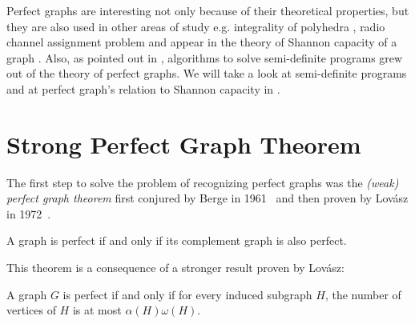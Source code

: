 Perfect graphs are interesting not only because of their theoretical properties, but they are also used in other areas of study e.g. integrality of polyhedra \cite{Chvtal1975, Chudnovsky2003}, radio channel assignment problem \cite{McDiarmid99, McDiarmid2000} and appear in the theory of Shannon capacity of a graph \cite{Lovasz1979}. Also, as pointed out in \cite{alfonsinPerfect2001, Chudnovsky2003}, algorithms to solve semi-definite programs grew out of the theory of perfect graphs. We will take a look at semi-definite programs and at perfect graph's relation to Shannon capacity in .

\section{Strong Perfect Graph Theorem}
\label{sec:SPGT}

The first step to solve the problem of recognizing perfect graphs was the \emph{(weak) perfect graph theorem} first conjured by Berge in 1961~\cite{CB61} and then proven by Lovász in 1972~\cite{LL72}.

\begin{theorem}
	\label{thm:pgt}
	A graph is perfect if and only if its complement graph is also perfect.
\end{theorem}

This theorem is a consequence of a stronger result proven by Lovász:
\begin{theorem}
	\label{thm:omegaalpha}
	A graph $G$ is perfect if and only if for every induced subgraph $H$, the number of vertices of $H$ is at most $\alpha(H)\omega(H)$.
\end{theorem}



